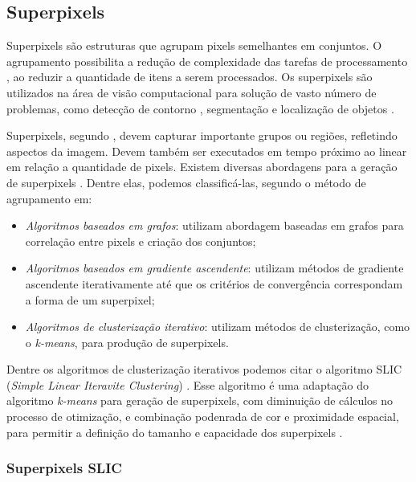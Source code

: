 \begin{document}

\subsection{Superpixels} \label{ssec:superpixels}

Superpixels são estruturas que agrupam pixels semelhantes em conjuntos. O agrupamento possibilita a redução de complexidade das tarefas de processamento \cite{SLIC}, ao reduzir a quantidade de itens a serem processados. Os superpixels são utilizados na área de visão computacional para solução de vasto número de problemas, como detecção de contorno \cite{CONTOUR}, segmentação \cite{SEG_MERGE} e localização de objetos \cite{SEG_LOCALIZ}.

Superpixels, segundo \cite{FELZENSZWALB}, devem capturar importante grupos ou regiões, refletindo aspectos da imagem. Devem também ser executados em tempo próximo ao linear em relação a quantidade de pixels. Existem diversas abordagens para a geração de superpixels \cite{SLIC}. Dentre elas, podemos classificá-las, segundo o método de agrupamento em: 

\begin{itemize}
 \item \textit{Algoritmos baseados em grafos}: utilizam abordagem baseadas em grafos para correlação entre pixels e criação dos conjuntos;
 \item \textit{Algoritmos baseados em gradiente ascendente}: utilizam métodos de gradiente ascendente iterativamente até que os critérios de convergência correspondam a forma de um superpixel; 
 \item \textit{Algoritmos de clusterização iterativo}: utilizam métodos de clusterização, como o \textit{k-means}, para produção de superpixels.
\end{itemize}

Dentre os algoritmos de clusterização iterativos podemos citar o algoritmo SLIC (\textit{Simple Linear Iteravite Clustering}) \cite{SLIC}. Esse algoritmo é uma adaptação do algoritmo \textit{k-means} para geração de superpixels, com diminuição de cálculos no processo de otimização, e combinação podenrada de cor e proximidade espacial, para permitir a definição do tamanho e capacidade dos superpixels \cite{SLIC}.

\subsubsection{Superpixels SLIC} \label{sssec:slic}
\end{document}

